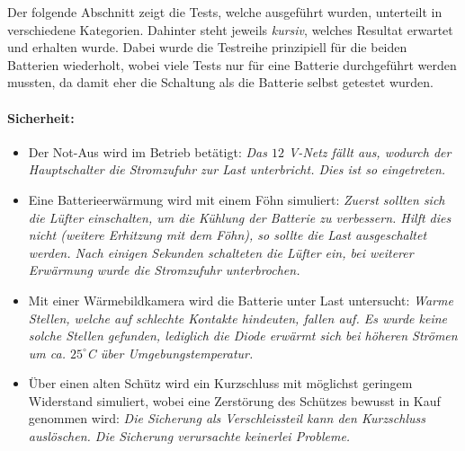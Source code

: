 Der folgende Abschnitt zeigt die Tests, welche ausgeführt wurden, unterteilt in verschiedene Kategorien. Dahinter steht jeweils \textit{kursiv}, welches Resultat erwartet und erhalten wurde. Dabei wurde die Testreihe prinzipiell für die beiden Batterien wiederholt, wobei viele Tests nur für eine Batterie durchgeführt werden mussten, da damit eher die Schaltung als die Batterie selbst getestet wurden.

\paragraph{Sicherheit:} \begin{itemize}
	\item Der Not-Aus wird im Betrieb betätigt: \textit{Das $12$ V-Netz fällt aus, wodurch der Hauptschalter die Stromzufuhr zur Last unterbricht. Dies ist so eingetreten.}
	\item Eine Batterieerwärmung wird mit einem Föhn simuliert: \textit{Zuerst sollten sich die Lüfter einschalten, um die Kühlung der Batterie zu verbessern. Hilft dies nicht (weitere Erhitzung mit dem Föhn), so sollte die Last ausgeschaltet werden. Nach einigen Sekunden schalteten die Lüfter ein, bei weiterer Erwärmung wurde die Stromzufuhr unterbrochen.}
	\item Mit einer Wärmebildkamera wird die Batterie unter Last untersucht: \textit{Warme Stellen, welche auf schlechte Kontakte hindeuten, fallen auf. Es wurde keine solche Stellen gefunden, lediglich die Diode erwärmt sich bei höheren Strömen um ca. $25^\circ$C über Umgebungstemperatur.}
	\item Über einen alten Schütz wird ein Kurzschluss mit möglichst geringem Widerstand simuliert, wobei eine Zerstörung des Schützes bewusst in Kauf genommen wird: \textit{Die Sicherung als Verschleissteil kann den Kurzschluss auslöschen. Die Sicherung verursachte keinerlei Probleme.}
\end{itemize}

